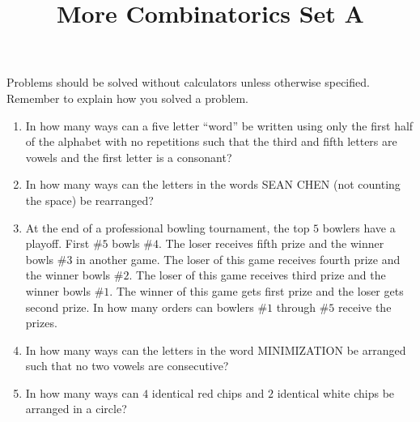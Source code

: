 \documentclass{article}
\title{More Combinatorics Set A}
\date{}
\author{}
\begin{document}
\maketitle
\noindent Problems should be solved without calculators unless otherwise 
specified. Remember to explain how you solved a problem.
\begin{enumerate}
    \item In how many ways can a five letter ``word'' be written using only 
        the first half of the alphabet with no repetitions such that the 
        third and fifth letters are vowels and the first letter is a 
        consonant?
        \vspace{3cm}
    \item In how many ways can the letters in the words SEAN CHEN (not counting 
        the space) be rearranged?
        \vspace{3cm}
    \item At the end of a professional bowling tournament, the top $5$ bowlers have a 
        playoff. First \#$5$ bowls \#$4$. The loser receives fifth prize and the winner 
        bowls \#$3$ in another game. The loser of this game receives fourth prize and the 
        winner bowls \#$2$. The loser of this game receives third prize and the winner bowls 
        \#$1$. The winner of this game gets first prize and the loser gets second prize. 
        In how many orders can bowlers \#$1$ through \#$5$ receive the prizes.
        \vspace{3cm}
    \item In how many ways can the letters in the word MINIMIZATION be arranged 
        such that no two vowels are consecutive?
        \vspace{3cm}
    \item In how many ways can $4$ identical red chips and $2$ identical white chips be 
        arranged in a circle?
        \vspace{3cm}
\end{enumerate}
\end{document}
